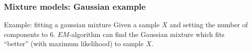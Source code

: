 \begin{frame}[t]
\frametitle{Mixture models: Gaussian example}
\begin{block}{Example: fitting a gaussian mixture}
Given a sample $X$ and setting the number of components to $6$. $EM$-algorithm can find the Gaussian mixture which fits ``better'' (with maximum likelihood) to sample $X$.
\end{block}
\medskip
\begin{columns}
%
%

\end{columns}
\end{frame}
